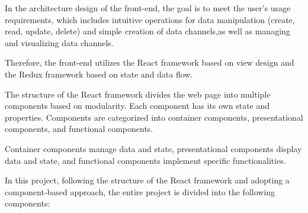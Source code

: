 
In the architecture design of the front-end,  
the goal is to meet the user's usage requirements, 
which includes intuitive operations for data manipulation (create, read, update, delete) 
and simple creation of data channels,as well as managing and visualizing data channels.

Therefore, the front-end utilizes the React framework based on view design 
and the Redux framework based on state and data flow.

The structure of the React framework divides the web page into multiple components 
based on modularity. Each component has its own state and properties.
Components are categorized into container components, presentational components, 
and functional components. 

Container components manage data and state, presentational components display data 
and state, and functional components implement specific functionalities.

In this project, following the structure of the React framework and adopting a component-based approach,
the entire project is divided into the following components:




